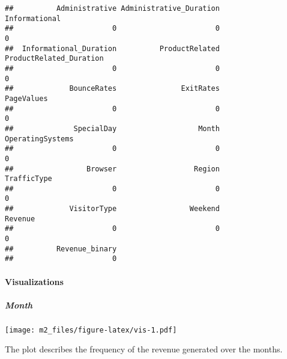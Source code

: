 \documentclass[
]{article}
\newenvironment{Shaded}{\begin{snugshade}}{\end{snugshade}}
\newcommand{\DataTypeTok}[1]{\textcolor[rgb]{0.13,0.29,0.53}{#1}}
\newcommand{\KeywordTok}[1]{\textcolor[rgb]{0.13,0.29,0.53}{\textbf{#1}}}
\newcommand{\NormalTok}[1]{#1}
\newcommand{\OperatorTok}[1]{\textcolor[rgb]{0.81,0.36,0.00}{\textbf{#1}}}
\newcommand{\StringTok}[1]{\textcolor[rgb]{0.31,0.60,0.02}{#1}}
\begin{document}
\begin{verbatim}
##          Administrative Administrative_Duration           Informational 
##                       0                       0                       0 
##  Informational_Duration          ProductRelated ProductRelated_Duration 
##                       0                       0                       0 
##             BounceRates               ExitRates              PageValues 
##                       0                       0                       0 
##              SpecialDay                   Month        OperatingSystems 
##                       0                       0                       0 
##                 Browser                  Region             TrafficType 
##                       0                       0                       0 
##             VisitorType                 Weekend                 Revenue 
##                       0                       0                       0 
##          Revenue_binary 
##                       0
\end{verbatim}

\hypertarget{visualizations}{%
\paragraph{\texorpdfstring{Visualizations\\
}{Visualizations }}\label{visualizations}}

\hypertarget{month}{%
\subparagraph{Month}\label{month}}

\begin{Shaded}
\end{Shaded}

\texttt{[image: m2\_files/figure-latex/vis-1.pdf]}

The plot describes the frequency of the revenue generated over the
months.
\end{document}

